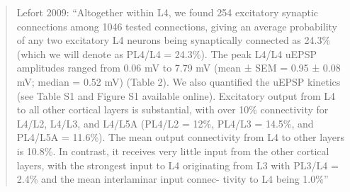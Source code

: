 \blockquote{Lefort 2009: \enquote{Altogether within L4, we found 254
    excitatory synaptic connections among 1046 tested connections,
    giving an average probability of any two excitatory L4 neurons
    being synaptically connected as 24.3\% (which we will denote as
    PL4/L4 = 24.3\%). The peak L4/L4 uEPSP amplitudes ranged from 0.06
    mV to 7.79 mV (mean ± SEM = 0.95 ± 0.08 mV; median = 0.52 mV)
    (Table 2). We also quantified the uEPSP kinetics (see Table S1 and
    Figure S1 available online).  Excitatory output from L4 to all other cortical layers is
    substantial, with over 10\% connectivity for L4/L2, L4/L3, and
    L4/L5A (PL4/L2 = 12\%, PL4/L3 = 14.5\%, and PL4/L5A = 11.6\%). The
    mean output connectivity from L4 to other layers is 10.8\%. In
    contrast, it receives very little input from the other cortical
    layers, with the strongest input to L4 originating from L3 with
    PL3/L4 = 2.4\% and the mean interlaminar input connec- tivity to
    L4 being 1.0\%}}
